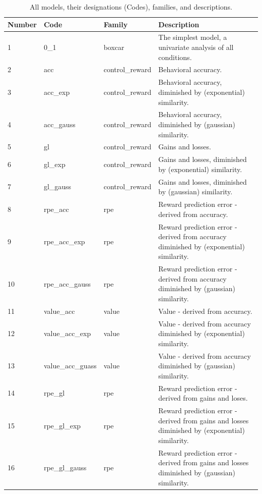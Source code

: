 \documentclass[doc,12pt]{apa}        %
\begin{document}
\begin{center}
    \begin{longtable}{ | l | l | l | p{6cm} |}
    \caption{All models, their designations (Codes), families, and descriptions.}\\
    \hline
    Number & Code & Family & Description \\ \hline
         1 & 0\_1 & boxcar & The simplest model, a univariate analysis of all conditions. \\ \hline
         2 & acc & control\_reward & Behavioral accuracy. \\ \hline
         3 & acc\_exp & control\_reward & Behavioral accuracy, diminished by (exponential) similarity. \\ \hline
         4 & acc\_gauss & control\_reward & Behavioral accuracy, diminished by (gaussian) similarity. \\ \hline
         5 & gl & control\_reward & Gains and losses. \\ \hline 
         6 & gl\_exp & control\_reward & Gains and losses, diminished by (exponential) similarity. \\ \hline
         7 & gl\_gauss & control\_reward & Gains and losses, diminished by (gaussian) similarity. \\ \hline
         8 & rpe\_acc & rpe & Reward prediction error - derived from accuracy. \\ \hline
         9 & rpe\_acc\_exp & rpe & Reward prediction error - derived from accuracy diminished by (exponential) similarity. \\ \hline
        10 & rpe\_acc\_gauss & rpe & Reward prediction error - derived from accuracy diminished by (gaussian) similarity. \\ \hline
        11 & value\_acc & value & Value - derived from accuracy. \\ \hline
        12 & value\_acc\_exp & value & Value - derived from accuracy diminished by (exponential) similarity. \\ \hline
        13 & value\_acc\_guass & value & Value - derived from accuracy diminished by (gaussian) similarity. \\ \hline
        14 & rpe\_gl & rpe & Reward prediction error - derived from gains and loses. \\ \hline
        15 & rpe\_gl\_exp & rpe & Reward prediction error - derived from gains and losses diminished by (exponential) similarity. \\ \hline
        16 & rpe\_gl\_gauss & rpe & Reward prediction error - derived from gains and losses diminished by (gaussian) similarity. \\ \hline

\end{longtable}
\end{center}
\end{document}
